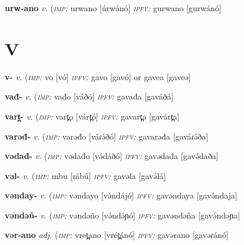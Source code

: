 \newentry
\headword\textbf{urw-ano}  
\ipa{[úrw-ánó]}
\synpos\textit{v.} 
\imperative(\textit {\textsc{imp:}} urwano [úrwánó]
\imperfective\textit{\textsc{ipfv:}} gurwano [gurwánó]


\section*{V}\label{V}

\newentry
\headword\textbf{v-}  
\ipa{[v-]}
\synpos\textit{v.} 
\imperative(\textit {\textsc{imp:}} vo [vó]	
\imperfective\textit{\textsc{ipfv:}} gavo [gavó] or gavea [gaveə]

\newentry
\headword\textbf{vađ-}  
\ipa{[váð-]}
\synpos\textit{v.} 
\imperative(\textit {\textsc{imp:}} vađo [váðó]	
\imperfective\textit{\textsc{ipfv:}} gavađa [gaváðá] %

\newentry
\headword\textbf{vart̪-}  
\ipa{[várt̪-]}
\synpos\textit{v.} 
\imperative(\textit {\textsc{imp:}} vart̪o [várt̪ó]	
\imperfective\textit{\textsc{ipfv:}} gavart̪a [gavárt̪a]  

\newentry
\headword\textbf{varəđ-}  
\ipa{[váɾə́ð-]}
\synpos\textit{v.} 
\imperative(\textit {\textsc{imp:}} varəđo [váɾə́ðó]	
\imperfective\textit{\textsc{ipfv:}} gavarəđa [gaváɾə́ða]  

\newentry
\headword\textbf{vədađ-}  
\ipa{[və́dað-]}
\synpos\textit{v.} 
\imperative(\textit {\textsc{imp:}} vədađo [və́dáðó]	
\imperfective\textit{\textsc{ipfv:}} gavədađa [gavə́daða] 

\newentry
\headword\textbf{vəl-}  
\ipa{[və́l-]}
\synpos\textit{v.} 
\imperative(\textit {\textsc{imp:}} mbu [ḿbú]	
\imperfective\textit{\textsc{ipfv:}} gavəla [gavə́lá] 

\newentry
\headword\textbf{vənday-}  
\ipa{[və́ndaj-]}
\synpos\textit{v.} 
\imperative(\textit {\textsc{imp:}} vəndayo [və́ndájó]	
\imperfective\textit{\textsc{ipfv:}} gavəndaya [gavə́ndaja]

\newentry
\headword\textbf{vəndəñ-}  
\ipa{[və́ndəɲ-]}
\synpos\textit{v.} 
\imperative(\textit {\textsc{imp:}} vəndəño [və́ndə́ɲó]	
\imperfective\textit{\textsc{ipfv:}} gavəndəña [gavə́ndəɲa]

\newentry
\headword\textbf{vər-ano}  
\ipa{[vəɾ-ánó]}
\synpos\textit{adj.} 
\imperative(\textit {\textsc{imp:}} vret̪ano [vrét̪ánó]	
\imperfective\textit{\textsc{ipfv:}} gavərano [gavəɾánó]

